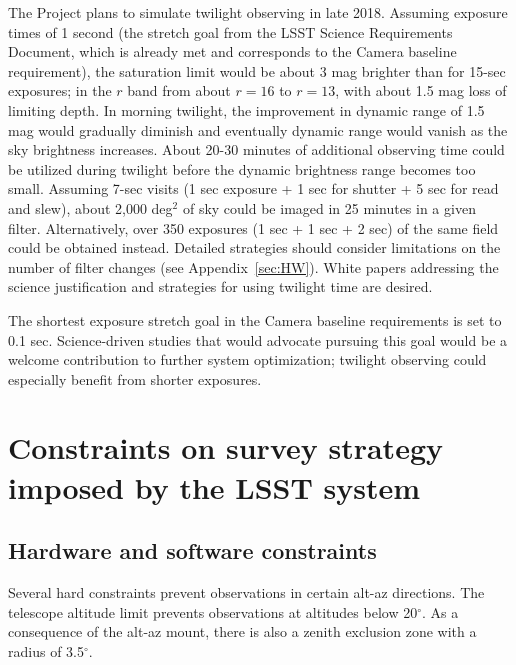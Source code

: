 \documentclass[DM,lsstdraft,toc,usenatbib]{lsstdoc}
\begin{document}
The Project plans to simulate twilight observing in late 2018.
Assuming exposure times of 1 second (the stretch goal from the LSST Science Requirements Document, 
which is already met and corresponds to the Camera baseline requirement), the saturation limit would be
about 3 mag brighter than for 15-sec exposures; in the $r$ band from about $r=16$ to $r=13$,
with about 1.5 mag loss of limiting depth. In morning twilight, the improvement in dynamic range of 1.5 mag would gradually
diminish and eventually dynamic range would vanish as the sky brightness increases. About 20-30 minutes
of additional observing time could be utilized during twilight before the dynamic brightness range becomes
too small. Assuming 7-sec visits (1 sec exposure + 1 sec for shutter + 5 sec for read and slew), about 
2,000 deg$^2$ of sky could be imaged in 25 minutes in a given filter. Alternatively, over 
350 exposures (1 sec + 1 sec + 2 sec) of the same field could be obtained instead.  Detailed strategies
should consider limitations on the number of filter changes (see Appendix~\ref{sec:HW}). 
White papers addressing the science justification and strategies for using twilight time are desired.

The shortest exposure stretch goal in the Camera baseline requirements is set to 0.1 sec. Science-driven
studies that would advocate pursuing this goal would be a welcome contribution to further system
optimization; twilight observing could especially benefit from shorter exposures. 
 

\section{Constraints on survey strategy imposed by the LSST system} 

\subsection{Hardware and software constraints \label{sec:HW}}


Several hard constraints prevent observations in certain alt-az directions. The telescope altitude limit
prevents observations at altitudes below 20$^\circ$.  As a consequence of the alt-az mount, there
is also a zenith exclusion zone with a radius of 3.5$^\circ$. 
\end{document}
